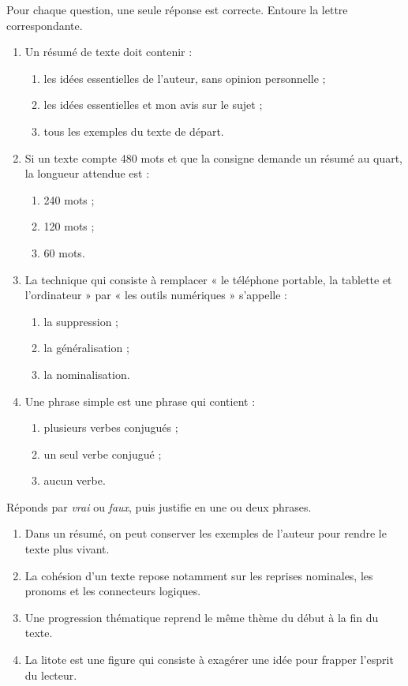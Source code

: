 \documentclass[11pt]{article}
\begin{document}
\begin{exercice}
Pour chaque question, une seule réponse est correcte. Entoure la lettre correspondante.
\begin{enumerate}
\item Un résumé de texte doit contenir :
\begin{enumerate}
\item[a)] les idées essentielles de l'auteur, sans opinion personnelle ;
\item[b)] les idées essentielles et mon avis sur le sujet ;
\item[c)] tous les exemples du texte de départ.
\end{enumerate}
\item Si un texte compte 480 mots et que la consigne demande un résumé au quart, la longueur attendue est :
\begin{enumerate}
\item[a)] 240 mots ; \item[b)] 120 mots ; \item[c)] 60 mots.
\end{enumerate}
\item La technique qui consiste à remplacer « le téléphone portable, la tablette et l'ordinateur » par « les outils numériques » s'appelle :
\begin{enumerate}
\item[a)] la suppression ; \item[b)] la généralisation ; \item[c)] la nominalisation.
\end{enumerate}
\item Une phrase simple est une phrase qui contient :
\begin{enumerate}
\item[a)] plusieurs verbes conjugués ; \item[b)] un seul verbe conjugué ; \item[c)] aucun verbe.
\end{enumerate}
\end{enumerate}
\end{exercice}

\begin{exercice}
Réponds par \emph{vrai} ou \emph{faux}, puis justifie en une ou deux phrases.
\begin{enumerate}
\item Dans un résumé, on peut conserver les exemples de l'auteur pour rendre le texte plus vivant.
\item La cohésion d'un texte repose notamment sur les reprises nominales, les pronoms et les connecteurs logiques.
\item Une progression thématique reprend le même thème du début à la fin du texte.
\item La litote est une figure qui consiste à exagérer une idée pour frapper l'esprit du lecteur.
\end{enumerate}
\end{exercice}
\end{document}
